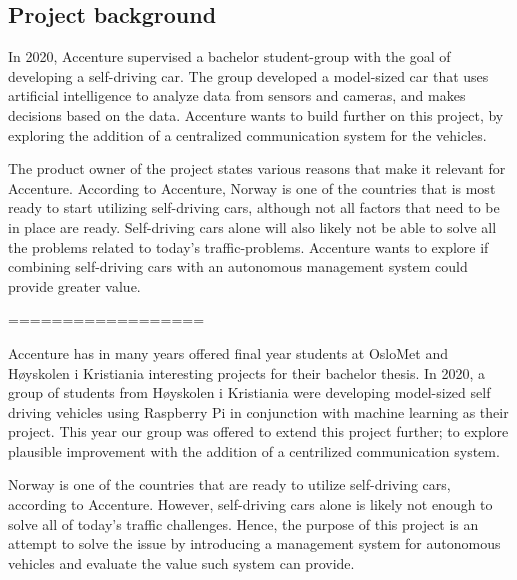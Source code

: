 \subsection{Project background}
In 2020, Accenture supervised a bachelor student-group with the goal of developing a self-driving car. The group developed a model-sized car that uses artificial intelligence to analyze data from sensors and cameras, and makes decisions based on the data. Accenture wants to build further on this project, by exploring the addition of a centralized communication system for the vehicles.

The product owner of the project states various reasons that make it relevant for Accenture. According to Accenture, Norway is one of the countries that is most ready to start utilizing self-driving cars, although not all factors that need to be in place are ready. Self-driving cars alone will also likely not be able to solve all the problems related to today's traffic-problems. Accenture wants to explore if combining self-driving cars with an autonomous management system could provide greater value. 

==================

Accenture has in many years offered final year students at OsloMet and Høyskolen i Kristiania interesting projects for their bachelor thesis. In 2020, a group of students from Høyskolen i Kristiania were developing model-sized self driving vehicles using Raspberry Pi in conjunction with machine learning as their project. This year our group was offered to extend this project further; to explore plausible improvement with the addition of a centrilized communication system.

Norway is one of the countries that are ready to utilize self-driving cars, according to Accenture. However, self-driving cars alone is likely not enough to solve all of today's traffic challenges. Hence, the purpose of this project is an attempt to solve the issue by introducing a management system for autonomous vehicles and evaluate the value such system can provide.